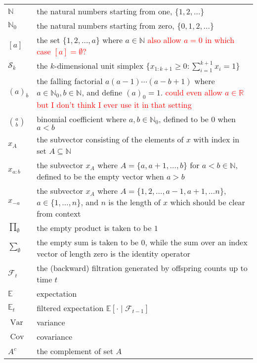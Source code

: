\documentclass[oneside]{scrbook} %
\newcommand{\seb}[1]{\xspace\textcolor{red}{#1}\xspace} %
\theoremstyle{definition}
\newcommand{\E}{\mathbb{E}}
\newcommand{\Et}{\mathbb{E}_t}
\newcommand{\V}{\operatorname{Var}}
\newcommand{\Cov}{\operatorname{Cov}}
\newcommand{\1}[1]{\mathbbm{1}_{#1}} %
\begin{document}
\begin{longtable}{p{} p{}}
$\mathbb{N}$ & the natural numbers starting from one, $\{1,2,\dots \}$ \\
$\mathbb{N}_0$ & the natural numbers starting from zero, $\{0,1,2,\dots \}$ \\
$[a]$ & the set $\{1,2,\dots,a\}$ where $a\in\mathbb{N}$ \seb{also allow $a=0$ in which case $[a] = \emptyset$?} \\
$\mathcal{S}_k$ & the $k$-dimensional unit simplex $\{ x_{1:k+1} \geq 0 : \sum_{i=1}^{k+1} x_i = 1 \}$ \\
$(a)_b$ & the falling factorial $a (a-1) \cdots (a-b+1)$ 
    where $a \in \mathbb{N}_0, b \in \mathbb{N}$, and define $(a)_0 = 1$. \seb{could even allow $a\in\mathbb{R}$ but I don't think I ever use it in that setting} \\
$\binom{a}{b}$ & binomial coefficient where $a,b \in \mathbb{N}_0$, defined to be $0$ when $a<b$ \\
$x_A$ & the subvector consisting of the elements of $x$ with index in set $A\subseteq\mathbb{N}$ \\
$x_{a:b}$ & the subvector $x_A$ where $A = \{a,a+1, \dots,b\}$ for $a<b\in\mathbb{N}$, defined to be the empty vector when $a>b$ \\
$x_{-a}$ & the subvector $x_A$ where $A = \{1,2, \dots, a-1, a+1, \dots n\}$, $a\in\{1,\dots,n\}$, and $n$ is the length of $x$ which should be clear from context \\
$\prod_{\emptyset}$ & the empty product is taken to be $1$ \\
$\sum_{\emptyset}$ & the empty sum is taken to be $0$, while the sum over
    an index vector of length zero is the identity operator \\
$\mathcal{F}_{t}$ & the (backward) filtration generated by offspring counts 
    up to time $t$ \\
$\E$ & expectation \\
$\Et$ & filtered expectation $\E[ \cdot \mid \mathcal{F}_{t-1}]$\\
$\V$ & variance \\
$\Cov$ & covariance \\
$A^c$ & the complement of set $A$\\

\end{longtable}
\end{document}
